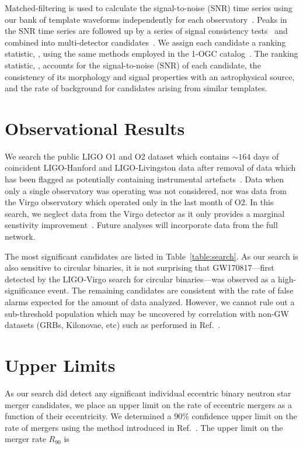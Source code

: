 Matched-filtering is used to calculate the signal-to-noise (SNR) time series using our bank of template waveforms independently for each observatory~\cite{Allen:2005fk}. Peaks in the SNR time series are followed up by a series of signal consistency tests~\cite{Nitz:2017lco,Allen:2004gu} and combined into multi-detector candidates~\cite{Usman:2015kfa,Nitz:2017svb}. We assign each candidate a ranking statistic, \rankingstat, using the same methods employed in the 1-OGC catalog~\cite{Nitz:2018imz}. The ranking statistic, \rankingstat, accounts for the signal-to-noise (SNR) of each candidate, the consistency of its morphology and signal properties with an astrophysical source, and the rate of background for candidates arising from similar templates.

\section{Observational Results}

We search the public LIGO O1 and O2 dataset which contains $\sim164$ days of coincident LIGO-Hanford and LIGO-Livingston data after removal of data which has been flagged as potentially containing instrumental artefacts~\cite{TheLIGOScientific:2016zmo,TheLIGOScientific:2017lwt,Vallisneri:2014vxa}. Data when only a single observatory was operating was not considered, nor was data from the Virgo observatory which operated only in the last month of O2. In this search, we neglect data from the Virgo detector as it only provides a marginal senstivity improvement~\cite{Nitz:2019hdf}. Future analyses will incorporate data from the full network.

The most significant candidates are listed in Table~\ref{table:search}. As our search is also sensitive to circular binaries, it is not surprising that GW170817---first detected by the LIGO-Virgo search for circular binaries---was observed as a high-significance event. The remaining candidates are consistent with the rate of false alarms expected for the amount of data analyzed. However, we cannot rule out a sub-threshold population which may be uncovered by correlation with non-GW datasets (GRBs, Kilonovae, etc) such as performed in Ref.~\cite{Nitz:2019bxt}.

\section{Upper Limits}

As our search did detect any significant individual eccentric binary neutron star merger candidates, we place an upper limit on the rate of eccentric mergers as a function of their eccentricity. We determined a $90\%$ confidence upper limit on the rate of mergers using the method introduced in Ref.~\cite{Brady:2004gt}. The upper limit on the merger rate $R_{90}$ is

